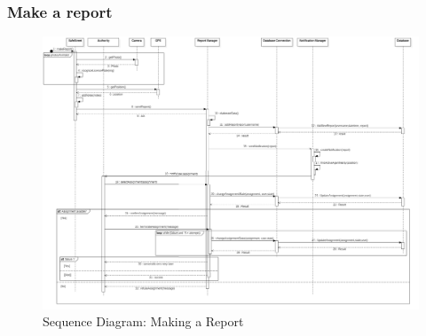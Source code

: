 \subsubsection{Make a report}
\begin{figure}[H]
\centering
\includegraphics[width=\textwidth]{Images/SequenceMakeReport.png}
\caption{\label{fig:ComWI}Sequence Diagram: Making a Report}
\end{figure}
